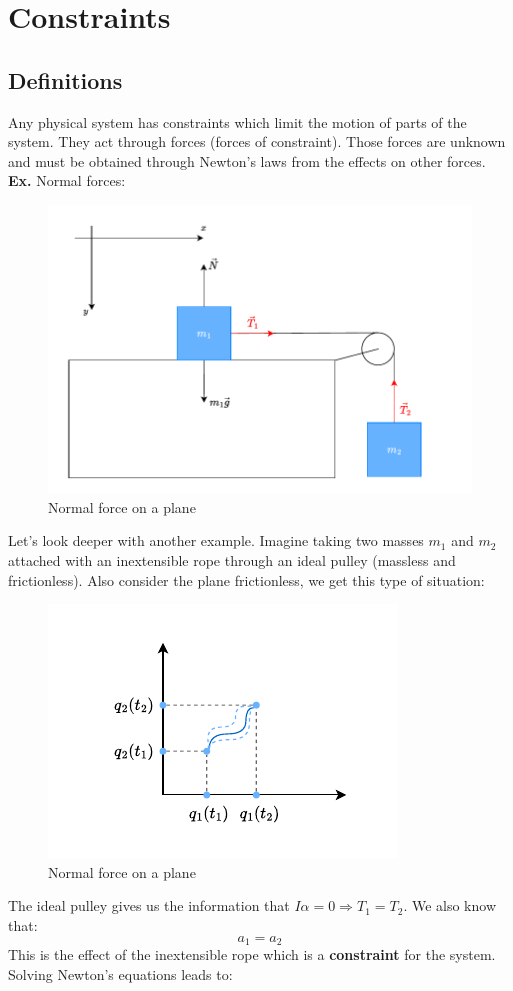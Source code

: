 \chapter{Constraints}
\section{Definitions}
Any physical system has constraints which limit the motion of parts of the system. They act through forces (forces of constraint). Those forces are unknown and must be obtained through Newton's laws from the effects on other forces.\\
\textbf{Ex.} Normal forces:
\begin{figure}[H]
    \centering
    \includegraphics[width=0.5\linewidth]{res/svg/idealpulley.drawio}
    \caption{Normal force on a plane}
    \label{fig:image6}
\end{figure}
Let's look deeper with another example. Imagine taking two masses $m_1$ and $m_2$ attached with an inextensible rope through an ideal pulley (massless and frictionless). Also consider the plane frictionless, we get this type of situation:
\begin{figure}[H]
    \centering
    \includegraphics[width=0.6\linewidth]{res/svg/leastactionpath.drawio}
    \caption{Normal force on a plane}
    \label{fig:image7}
\end{figure}
The ideal pulley gives us the information that $I\alpha = 0 \Rightarrow T_1 = T_2$. We also know that:
\[a_1 = a_2\]
This is the effect of the inextensible rope which is a \textbf{constraint} for the system. Solving Newton's equations leads to:
